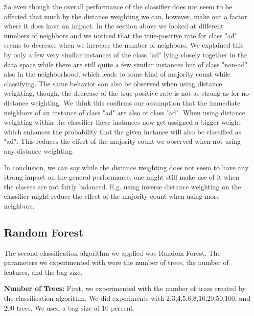 \documentclass{sig-alternate-05-2015}
\begin{document}
{So even though the overall performance of the classifier does not seem to be affected that much by the distance weighting we can, however, make out a factor where it does have an impact. In the section above we looked at different numbers of neighbors and we noticed that the true-positive rate for class "ad" seems to decrease when we increase the number of neighbors. We explained this by only a few very similar instances of the class "ad" lying closely together in the data space while there are still quite a few similar instances but of class "non-ad" also in the neighborhood, which leads to some kind of majority count while classifying. The same behavior can also be observed when using distance weighting, though, the decrease of the true-positive rate is not as strong as for no distance weighting. We think this confirms our assumption that the immediate neighbors of an instance of class "ad" are also of class "ad". When using distance weighting within the classifier these instances now get assigned a bigger weight which enhances the probability that the given instance will also be classified as "ad". This reduces the effect of the majority count we observed when not using any distance weighting.

In conclusion, we can say while the distance weighting does not seem to have any strong impact on the general performance, one might still make use of it when the classes are not fairly balanced. E.g. using inverse distance weighting on the classifier might reduce the effect of the majority count when using more neighbors.


\subsection{Random Forest}
The second classification algorithm we applied was Random Forest. The parameters we experimented with were the number of trees, the number of features, and the bag size.

\textbf{Number of Trees:}
First, we experimented with the number of trees created by the classification algorithm. We did experiments with 2,3,4,5,6,8,10,20,50,100, and 200 trees. We used a bag size of 10 percent.

}
\end{document}
